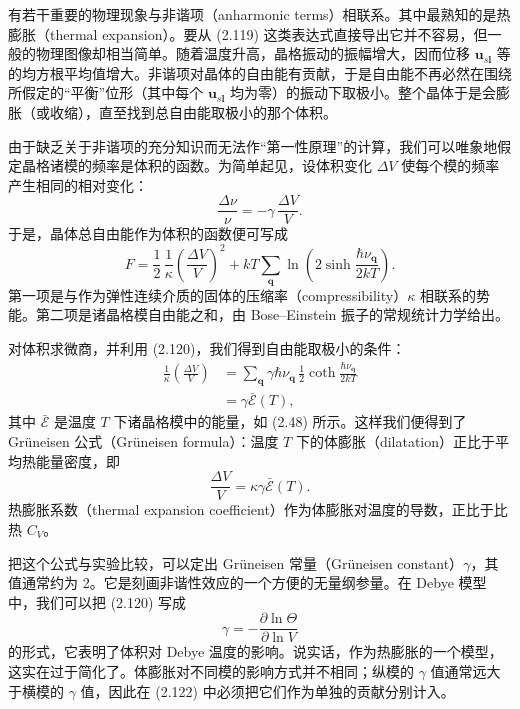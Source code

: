 有若干重要的物理现象与非谐项（anharmonic terms）相联系。其中最熟知的是热膨胀（thermal expansion）。要从 (2.119) 这类表达式直接导出它并不容易，但一般的物理图像却相当简单。随着温度升高，晶格振动的振幅增大，因而位移 $\mathbf{u}_{s\mathbf{l}}$ 等的均方根平均值增大。非谐项对晶体的自由能有贡献，于是自由能不再必然在围绕所假定的“平衡”位形（其中每个 $\mathbf{u}_{s\mathbf{l}}$ 均为零）的振动下取极小。整个晶体于是会膨胀（或收缩），直至找到总自由能取极小的那个体积。

由于缺乏关于非谐项的充分知识而无法作“第一性原理”的计算，我们可以唯象地假定晶格诸模的频率是体积的函数。为简单起见，设体积变化 $\Delta V$ 使每个模的频率产生相同的相对变化：
\begin{equation*}
\frac{\Delta\nu}{\nu}=-\gamma\,\frac{\Delta V}{V}.
\tag{2.120}
\end{equation*}
于是，晶体总自由能作为体积的函数便可写成
\begin{equation*}
F=\frac{1}{2}\,\frac{1}{\kappa}\left(\frac{\Delta V}{V}\right)^{2}+kT\sum_{\mathbf{q}}\ln\left(2\sinh\frac{\hbar\nu_{\mathbf{q}}}{2kT}\right).
\tag{2.121}
\end{equation*}
第一项是与作为弹性连续介质的固体的压缩率（compressibility）$\kappa$ 相联系的势能。第二项是诸晶格模自由能之和，由 Bose–Einstein 振子的常规统计力学给出。

对体积求微商，并利用 (2.120)，我们得到自由能取极小的条件：
\begin{align*}
\frac{1}{\kappa}\left(\frac{\Delta V}{V}\right)&=\sum_{\mathbf{q}}\gamma\hbar\nu_{\mathbf{q}}\,\tfrac{1}{2}\coth\frac{\hbar\nu_{\mathbf{q}}}{2kT}\\
&=\gamma\bar{\mathcal{E}}(T),
\tag{2.122}
\end{align*}
其中 $\bar{\mathcal{E}}$ 是温度 $T$ 下诸晶格模中的能量，如 (2.48) 所示。这样我们便得到了 Grüneisen 公式（Grüneisen formula）：温度 $T$ 下的体膨胀（dilatation）正比于平均热能量密度，即
\begin{equation*}
\frac{\Delta V}{V}=\kappa\gamma\bar{\mathcal{E}}(T).
\tag{2.123}
\end{equation*}
热膨胀系数（thermal expansion coefficient）作为体膨胀对温度的导数，正比于比热 $C_{V}$。

把这个公式与实验比较，可以定出 Grüneisen 常量（Grüneisen constant）$\gamma$，其值通常约为 2。它是刻画非谐性效应的一个方便的无量纲参量。在 Debye 模型中，我们可以把 (2.120) 写成
\begin{equation*}
\gamma=-\frac{\partial\ln\Theta}{\partial\ln V}
\tag{2.124}
\end{equation*}
的形式，它表明了体积对 Debye 温度的影响。说实话，作为热膨胀的一个模型，这实在过于简化了。体膨胀对不同模的影响方式并不相同；纵模的 $\gamma$ 值通常远大于横模的 $\gamma$ 值，因此在 (2.122) 中必须把它们作为单独的贡献分别计入。

